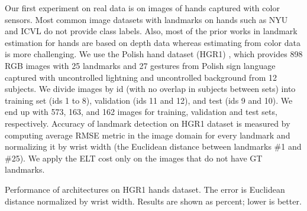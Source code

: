 \documentclass[10pt,twocolumn,letterpaper]{article}
\begin{document}
Our first experiment on real data is on images of hands captured with color sensors. Most common image datasets with landmarks on hands such as NYU \cite{tompson2014NYUhands} and ICVL \cite{tang2014ICVLhands} do not provide class labels. 
Also, most of the prior works in landmark estimation for hands are based on depth data \cite{yuan20183d, tompson2014NYUhands, tang2014ICVLhands, sridhar2013interactive, sun2015cascaded, sinha2016deephand} whereas estimating from color data is more challenging. 
We use the Polish hand dataset (HGR1) \cite{kawulok2014PolishHands, nalepa2014PolishHands}, which provides 898 RGB images with 25 landmarks and 27 gestures from Polish sign language captured with uncontrolled lightning and uncontrolled background from 12 subjects. We divide images by id (with no overlap in subjects between sets) into training set (ids 1 to 8), validation (ids 11 and 12), and test (ids 9 and 10). We end up with 573, 163, and 162 images for training, validation and test sets, respectively.
Accuracy of landmark detection on HGR1 dataset is measured by computing average RMSE metric in the image domain for every landmark and normalizing it by wrist width (the Euclidean distance between landmarks \#1 and \#25). We apply the ELT cost only on the images that do not have GT landmarks.
\caption{\small Performance of architectures on HGR1 hands dataset. The error is Euclidean distance normalized by wrist width. Results are shown as percent; lower is better.}
\label{tab:hands}
\vskip2pt
\centering
{}
\end{document}
